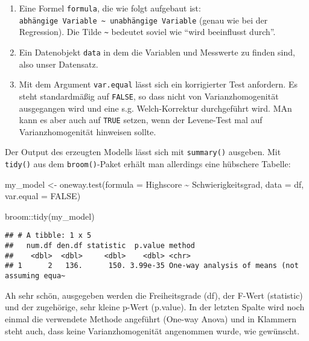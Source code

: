 \documentclass[
]{book}
\newenvironment{Shaded}{\begin{snugshade}}{\end{snugshade}}
\newcommand{\AttributeTok}[1]{\textcolor[rgb]{0.77,0.63,0.00}{#1}}
\newcommand{\ConstantTok}[1]{\textcolor[rgb]{0.00,0.00,0.00}{#1}}
\newcommand{\FunctionTok}[1]{\textcolor[rgb]{0.00,0.00,0.00}{#1}}
\newcommand{\NormalTok}[1]{#1}
\newcommand{\OtherTok}[1]{\textcolor[rgb]{0.56,0.35,0.01}{#1}}
\newcommand{\SpecialCharTok}[1]{\textcolor[rgb]{0.00,0.00,0.00}{#1}}
\begin{document}
\begin{enumerate}
\def\labelenumi{\arabic{enumi}.}
\item
  Eine Formel \texttt{formula}, die wie folgt aufgebaut ist: \texttt{abhängige\ Variable\ \textasciitilde{}\ unabhängige\ Variable} (genau wie bei der Regression). Die Tilde \texttt{\textasciitilde{}} bedeutet soviel wie ``wird beeinflusst durch''.
\item
  Ein Datenobjekt \texttt{data} in dem die Variablen und Messwerte zu finden sind, also unser Datensatz.
\item
  Mit dem Argument \texttt{var.equal} lässt sich ein korrigierter Test anfordern. Es steht standardmäßig auf \texttt{FALSE}, so dass nicht von Varianzhomogenität ausgegangen wird und eine s.g. Welch-Korrektur durchgeführt wird. MAn kann es aber auch auf \texttt{TRUE} setzen, wenn der Levene-Test mal auf Varianzhomogenität hinweisen sollte.
\end{enumerate}

Der Output des erzeugten Modells lässt sich mit \texttt{summary()} ausgeben. Mit \texttt{tidy()} aus dem \texttt{broom()}-Paket erhält man allerdings eine hübschere Tabelle:

\begin{Shaded}
\begin{Highlighting}[]
\NormalTok{my\_model }\OtherTok{\textless{}{-}} \FunctionTok{oneway.test}\NormalTok{(}\AttributeTok{formula =}\NormalTok{ Highscore }\SpecialCharTok{\textasciitilde{}}\NormalTok{ Schwierigkeitsgrad, }
                        \AttributeTok{data =}\NormalTok{ df, }
                        \AttributeTok{var.equal =} \ConstantTok{FALSE}\NormalTok{)}

\NormalTok{broom}\SpecialCharTok{::}\FunctionTok{tidy}\NormalTok{(my\_model)}
\end{Highlighting}
\end{Shaded}

\begin{verbatim}
## # A tibble: 1 x 5
##   num.df den.df statistic  p.value method                                       
##    <dbl>  <dbl>     <dbl>    <dbl> <chr>                                        
## 1      2   136.      150. 3.99e-35 One-way analysis of means (not assuming equa~
\end{verbatim}

Ah sehr schön, ausgegeben werden die Freiheitsgrade (df), der F-Wert (statistic) und der zugehörige, sehr kleine p-Wert (p.value). In der letzten Spalte wird noch einmal die verwendete Methode angeführt (One-way Anova) und in Klammern steht auch, dass keine Varianzhomogenität angenommen wurde, wie gewünscht.
\end{document}
